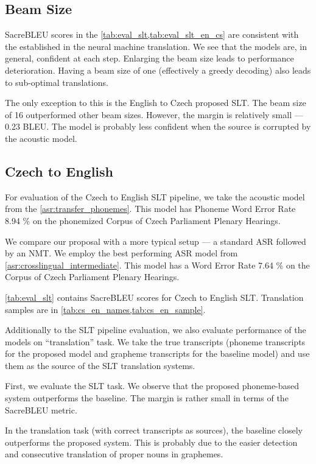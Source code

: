 \subsection{Beam Size} 
SacreBLEU scores in the \cref{tab:eval_slt,tab:eval_slt_en_cs} are consistent with the established in the neural machine translation. We see that the models are, in general, confident at each step. Enlarging the beam size leads to performance deterioration. Having a beam size of one (effectively a greedy decoding) also leads to sub-optimal translations.

The only exception to this is the English to Czech proposed SLT. The beam size of 16 outperformed other beam sizes. However, the margin is relatively small --- 0.23 BLEU. The model is probably less confident when the source is corrupted by the acoustic model.

\subsection{Czech to English}
For evaluation of the Czech to English SLT pipeline, we take the acoustic model from the \cref{asr:transfer_phonemes}. This model has Phoneme Word Error Rate 8.94 \% on the phonemized Corpus of Czech Parliament Plenary Hearings.

We compare our proposal with a more typical setup --- a standard ASR followed by an NMT. We employ the best performing ASR model from \cref{asr:crosslingual_intermediate}. This model has a Word Error Rate 7.64 \% on the Corpus of Czech Parliament Plenary Hearings.

\cref{tab:eval_slt} contains SacreBLEU scores for Czech to English SLT. Translation samples are in \cref{tab:cs_en_names,tab:cs_en_sample}.

Additionally to the SLT pipeline evaluation, we also evaluate performance of the models on ``translation'' task. We take the true transcripts (phoneme transcripts for the proposed model and grapheme transcripts for the baseline model) and use them as the source of the SLT translation systems.

First, we evaluate the SLT task. We observe that the proposed phoneme-based system outperforms the baseline. The margin is rather small in terms of the SacreBLEU metric.

In the translation task (with correct transcripts as sources), the baseline closely outperforms the proposed system. This is probably due to the easier detection and consecutive translation of proper nouns in graphemes.


